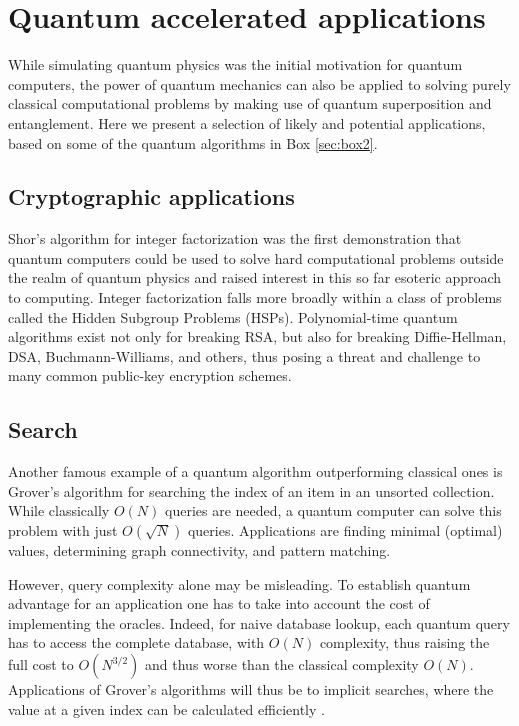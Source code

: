 \documentclass[journal]{IEEEtran}
\begin{document}
\section{Quantum accelerated applications}
While simulating quantum physics was the initial motivation for quantum computers, the power of quantum mechanics can also be applied to solving purely classical computational problems by making use of quantum superposition and entanglement. Here we present a selection of likely and potential applications, based on some of the quantum algorithms in Box \ref{sec:box2}.

\subsection{Cryptographic applications}
Shor's algorithm \cite{Shor1994} for integer factorization was the first demonstration that quantum computers could be used to solve hard computational problems outside the realm of quantum physics and raised interest in this so far esoteric approach to computing. Integer factorization falls more broadly within a class of problems called the Hidden Subgroup Problems (HSPs).  Polynomial-time quantum algorithms exist not only for breaking RSA, but also for breaking Diffie-Hellman, DSA, Buchmann-Williams, and others, thus posing a threat and challenge to many common public-key encryption schemes.

\subsection{Search}


Another famous example of a quantum algorithm outperforming classical ones is Grover's algorithm \cite{Grover1996} for searching the index of an item in an unsorted collection. While classically $O(N)$ queries are needed, a quantum computer can solve this problem with just $O(\sqrt{N})$ queries. Applications are finding minimal (optimal) values,  determining graph connectivity, and pattern matching.

However, query complexity alone may be misleading. To establish quantum advantage for an application one has to take into account the cost of implementing the oracles. Indeed, for naive database lookup, each quantum query has to access the complete database, with $O(N)$ complexity, thus raising the full cost to $O(N^{3/2})$ and thus worse than the classical complexity $O(N)$. Applications of Grover's algorithms will thus be to {\rm implicit} searches, where the value at a given index can be calculated efficiently \cite{MarkovGrover}. 
\end{document}
